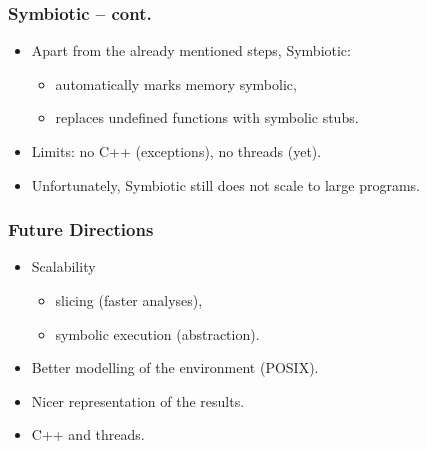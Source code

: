 \documentclass[sans]{beamer}
\begin{document}
\begin{frame}
\frametitle{Symbiotic -- cont.}
\begin{itemize}
  \item Apart from the already mentioned steps, Symbiotic:
  \begin{itemize}
    \item automatically marks memory symbolic,
    \item replaces undefined functions with symbolic stubs.
  \end{itemize}
  \item Limits: no C++ (exceptions), no threads (yet).
  \item Unfortunately, Symbiotic still does not scale to large programs.
\end{itemize}
\end{frame}

\begin{frame}
\frametitle{Future Directions}
\begin{itemize}
  \item Scalability
  \begin{itemize}
    \item slicing (faster analyses),
    \item symbolic execution (abstraction).
  \end{itemize}
  \item Better modelling of the environment (POSIX).
  \item Nicer representation of the results.
  \item C++ and threads.
\end{itemize}
\end{frame}
\end{document}
